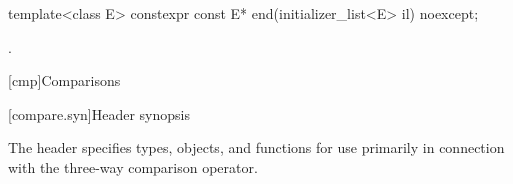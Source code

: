 %
\begin{itemdecl}
template<class E> constexpr const E* end(initializer_list<E> il) noexcept;
\end{itemdecl}

\begin{itemdescr}
\pnum
\returns
{}.
\end{itemdescr}

[cmp]{Comparisons}

[compare.syn]{Header  synopsis}

\pnum
The header  specifies types, objects, and functions
for use primarily in connection with
the three-way comparison operator.

%
%
%
%
%
%
%
%
